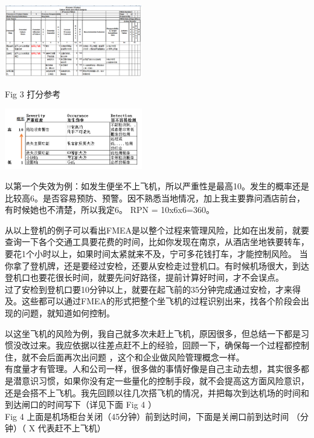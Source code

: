 
\includegraphics[width=6cm]{风险与机会2_FMEA.png}

Fig 3 打分参考


\includegraphics[width=6cm]{风险与机会3_打分参考_1.png}

以第一个失效为例：如发生便坐不上飞机，所以严重性是最高10。发生的概率还是比较高6。是否容易预防、预警。因不熟悉当地情况，加上我主要靠问酒店前台，有时候她也不清楚，所以我定6。
RPN = 10x6x6=360。

从以上登机的例子可以看出FMEA是以整个过程来管理风险，比如在出发前，就要查询一下各个交通工具要花费的时间，比如你发现在南京，从酒店坐地铁要转车，要花1个小时以上，如果时间太紧就来不及，宁可多花钱打车，才能控制风险。
当你拿了登机牌，还是要经过安检，还要从安检走过登机口。有时候机场很大，到达登机口也要花很长时间，就要先问好路径，提前计算好时间，才不会误点。\\
过了安检到登机口要10分钟以上，就要在起飞前的35分钟完成通过安检，才来得及。这些都可以通过FMEA的形式把整个坐飞机的过程识别出来，找各个阶段会出现的问题，就知道如何控制。

以这坐飞机的风险为例，我自己就多次未赶上飞机，原因很多，但总结一下都是习惯没改过来。我应依据以往差点赶不上的经验，回顾一下，确保每一个过程都控制住，就不会后面再次出问题
，这个和企业做风险管理概念一样。\\
有度量才有管理。人和公司一样，很多做的事情好像是自己主动去想，其实很多都是潜意识习惯，如果你没有定一些量化的控制手段，就不会提高这方面风险意识，还是会搭不上飞机。我先回顾以往几次搭飞机的情况，并把每次到达机场的时间和到达闸口的时间写下（详见下面
Fig 4 ）\\
Fig 4 上面是机场柜台关闭（45分钟）前到达时间，下面是关闸口前到达时间
（分钟）（ X 代表赶不上飞机）

